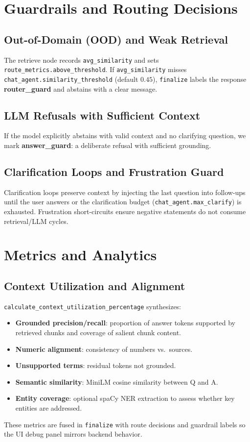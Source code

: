 \documentclass[11pt]{article}
\begin{document}
\section{Guardrails and Routing Decisions}
\subsection{Out-of-Domain (OOD) and Weak Retrieval}
The retrieve node records \texttt{avg\_similarity} and sets \texttt{route\_metrics.above\_threshold}. If \texttt{avg\_similarity} misses \texttt{chat\_agent.similarity\_threshold} (default $0.45$), \texttt{finalize} labels the response \textbf{router\_guard} and abstains with a clear message.

\subsection{LLM Refusals with Sufficient Context}
If the model explicitly abstains with valid context and no clarifying question, we mark \textbf{answer\_guard}: a deliberate refusal with sufficient grounding.

\subsection{Clarification Loops and Frustration Guard}
Clarification loops preserve context by injecting the last question into follow-ups until the user answers or the clarification budget (\texttt{chat\_agent.max\_clarify}) is exhausted. Frustration short-circuits ensure negative statements do not consume retrieval/LLM cycles.

\section{Metrics and Analytics}
\subsection{Context Utilization and Alignment}
\texttt{calculate\_context\_utilization\_percentage} synthesizes:
\begin{itemize}[leftmargin=1.25em]
  \item \textbf{Grounded precision/recall}: proportion of answer tokens supported by retrieved chunks and coverage of salient chunk content.
  \item \textbf{Numeric alignment}: consistency of numbers vs.\ sources.
  \item \textbf{Unsupported terms}: residual tokens not grounded.
  \item \textbf{Semantic similarity}: MiniLM cosine similarity between Q and A.
  \item \textbf{Entity coverage}: optional spaCy NER extraction to assess whether key entities are addressed.
\end{itemize}
These metrics are fused in \texttt{finalize} with route decisions and guardrail labels so the UI debug panel mirrors backend behavior.
\end{document}
